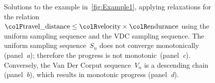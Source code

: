 \begin{center}
\begin{figure}[t]
\begin{centering}
{\begin{centering}
                                                                              \par
            \end{centering}
            }
            \par
        \end{centering}
        \caption{Solutions to the example in~\cref{fig:Example1}, applying relaxations
        for the relation ${\colF\text{travel\_distance}}\leq{\colR\text{velocity}}\times{\colR\text{endurance}}$
            using the uniform sampling sequence and the VDC sampling sequence.
            The uniform sampling sequence~$S_{n}$ does not converge monotonically
            (panel~\emph{a}); therefore the progress is not monotonic~(panel\emph{~c}).
            Conversely, the Van Der Corput sequence~$V_{n}$ is a descending
            chain (panel~\emph{b}), which results in monotonic progress (panel~\emph{d}).}
    \end{figure}
    \par
\end{center}


%
%
%
%


